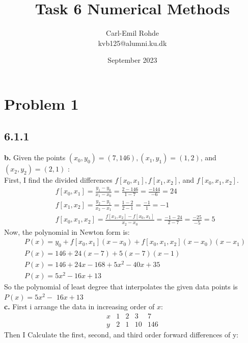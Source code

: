 \documentclass[manuscript,screen,review]{acmart}
\begin{document}
\title{Task 6  Numerical Methods}
\author{Carl-Emil Rohde \\ kvb125@alumni.ku.dk}
\date{September 2023}

\maketitle

\section{Problem 1}
\subsection{6.1.1}

\textbf{b.} Given the points $\left(x_0, y_0\right)=(7,146),\left(x_1, y_1\right)=(1,2)$, and $\left(x_2, y_2\right)=(2,1)$ :
\\
First, I find the divided differences $f\left[x_0, x_1\right], f\left[x_1, x_2\right]$, and $f\left[x_0, x_1, x_2\right]$.
\\
$$
\begin{aligned}
& f\left[x_0, x_1\right]=\frac{y_1-y_0}{x_1-x_0}=\frac{2-146}{1-7}=\frac{-144}{-6}=24 \\
& f\left[x_1, x_2\right]=\frac{y_2-y_1}{x_2-x_1}=\frac{1-2}{2-1}=\frac{-1}{1}=-1 \\
& f\left[x_0, x_1, x_2\right]=\frac{f\left[x_1, x_2\right]-f\left[x_0, x_1\right]}{x_2-x_0}=\frac{-1-24}{2-7}=\frac{-25}{-5}=5
\end{aligned}
$$
Now, the polynomial in Newton form is:
$$
\begin{aligned}
& P(x)=y_0+f\left[x_0, x_1\right]\left(x-x_0\right)+f\left[x_0, x_1, x_2\right]\left(x-x_0\right)\left(x-x_1\right) \\
& P(x)=146+24(x-7)+5(x-7)(x-1) \\
& P(x)=146+24 x-168+5 x^2-40 x+35 \\
& P(x)=5 x^2-16 x+13
\end{aligned}
$$
So the polynomial of least degree that interpolates the given data points is $P(x)=5 x^2-$ $16 x+13$
\\
\textbf{c.} First i arrange the data in increasing order of $x$:
$$
\begin{array}{l||r|r|r|r}
x & 1 & 2 & 3 & 7 \\
\hline y & 2 & 1 & 10 & 146
\end{array}
$$
Then I Calculate the first, second, and third order forward differences of y:
\end{document}
